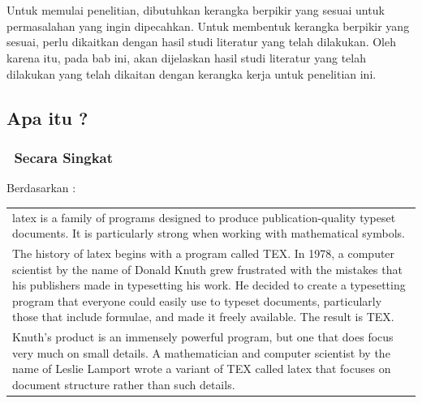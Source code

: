 \chapter{\babDua}
\label{bab:2}

Untuk memulai penelitian, dibutuhkan kerangka berpikir yang sesuai untuk permasalahan yang ingin dipecahkan.
Untuk membentuk kerangka berpikir yang sesuai, perlu dikaitkan dengan hasil studi literatur yang telah dilakukan.
Oleh karena itu, pada bab ini, akan dijelaskan hasil studi literatur yang telah dilakukan yang telah dikaitan dengan kerangka kerja untuk penelitian ini.


\section{Apa itu \latex?}
\label{sec:latex}

\subsection{\latex~Secara Singkat}
\label{sec:latexBrief}
Berdasarkan \cite{latex:intro}: \\
\begin{tabular}{| p{14cm} |}
	\hline
	\gls{latex} is a family of programs designed to produce publication-quality typeset documents.
	It is particularly strong when working with mathematical symbols. \\
	The history of \gls{latex} begins with a program called TEX.
	In 1978, a computer scientist by the name of Donald Knuth grew frustrated with the mistakes that his publishers made in typesetting his work.
	He decided to create a typesetting program that everyone could easily use to typeset documents, particularly those that include formulae, and made it freely available.
	The result is TEX. \\
	Knuth's product is an immensely powerful program, but one that does focus very much on small details.
	A mathematician and computer scientist by the name of Leslie Lamport wrote a variant of TEX called \gls{latex} that focuses on document structure rather than such details. \\
	\hline
\end{tabular}


